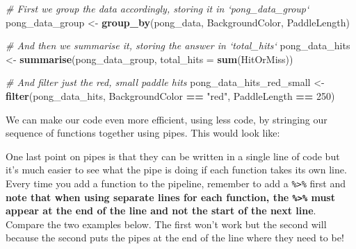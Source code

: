 \documentclass[]{book}
\newenvironment{Shaded}{\begin{snugshade}}{\end{snugshade}}
\newcommand{\CommentTok}[1]{\textcolor[rgb]{0.56,0.35,0.01}{\textit{#1}}}
\newcommand{\DataTypeTok}[1]{\textcolor[rgb]{0.13,0.29,0.53}{#1}}
\newcommand{\DecValTok}[1]{\textcolor[rgb]{0.00,0.00,0.81}{#1}}
\newcommand{\KeywordTok}[1]{\textcolor[rgb]{0.13,0.29,0.53}{\textbf{#1}}}
\newcommand{\NormalTok}[1]{#1}
\newcommand{\OperatorTok}[1]{\textcolor[rgb]{0.81,0.36,0.00}{\textbf{#1}}}
\newcommand{\StringTok}[1]{\textcolor[rgb]{0.31,0.60,0.02}{#1}}
\begin{document}
\begin{Shaded}
\begin{Highlighting}[]
\CommentTok{# First we group the data accordingly, storing it in `pong_data_group`}
\NormalTok{pong_data_group <-}\StringTok{ }\KeywordTok{group_by}\NormalTok{(pong_data, BackgroundColor, PaddleLength)}

\CommentTok{# And then we summarise it, storing the answer in `total_hits`}
\NormalTok{pong_data_hits <-}\StringTok{ }\KeywordTok{summarise}\NormalTok{(pong_data_group, }\DataTypeTok{total_hits =} \KeywordTok{sum}\NormalTok{(HitOrMiss))}

\CommentTok{# And filter just the red, small paddle hits}
\NormalTok{pong_data_hits_red_small <-}\StringTok{ }\KeywordTok{filter}\NormalTok{(pong_data_hits, BackgroundColor }\OperatorTok{==}\StringTok{ "red"}\NormalTok{, PaddleLength }\OperatorTok{==}\StringTok{ }\DecValTok{250}\NormalTok{)}
\end{Highlighting}
\end{Shaded}

We can make our code even more efficient, using less code, by stringing our sequence of functions together using pipes. This would look like:

\begin{Shaded}
\end{Shaded}

One last point on pipes is that they can be written in a single line of code but it's much easier to see what the pipe is doing if each function takes its own line. Every time you add a function to the pipeline, remember to add a \texttt{\%\textgreater{}\%} first and \textbf{note that when using separate lines for each function, the \texttt{\%\textgreater{}\%} must appear at the end of the line and not the start of the next line}. Compare the two examples below. The first won't work but the second will because the second puts the pipes at the end of the line where they need to be!
\end{document}
